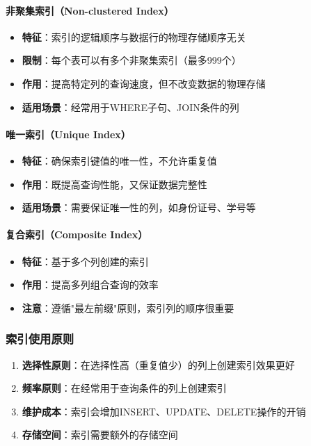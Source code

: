 \paragraph{非聚集索引（Non-clustered Index）}
\begin{itemize}
  \item \textbf{特征}：索引的逻辑顺序与数据行的物理存储顺序无关
  \item \textbf{限制}：每个表可以有多个非聚集索引（最多999个）
  \item \textbf{作用}：提高特定列的查询速度，但不改变数据的物理存储
  \item \textbf{适用场景}：经常用于WHERE子句、JOIN条件的列
\end{itemize}

\paragraph{唯一索引（Unique Index）}
\begin{itemize}
  \item \textbf{特征}：确保索引键值的唯一性，不允许重复值
  \item \textbf{作用}：既提高查询性能，又保证数据完整性
  \item \textbf{适用场景}：需要保证唯一性的列，如身份证号、学号等
\end{itemize}

\paragraph{复合索引（Composite Index）}
\begin{itemize}
  \item \textbf{特征}：基于多个列创建的索引
  \item \textbf{作用}：提高多列组合查询的效率
  \item \textbf{注意}：遵循"最左前缀"原则，索引列的顺序很重要
\end{itemize}

\subsubsection{索引使用原则}

\begin{enumerate}
  \item \textbf{选择性原则}：在选择性高（重复值少）的列上创建索引效果更好
  \item \textbf{频率原则}：在经常用于查询条件的列上创建索引
  \item \textbf{维护成本}：索引会增加INSERT、UPDATE、DELETE操作的开销
  \item \textbf{存储空间}：索引需要额外的存储空间
\end{enumerate}

